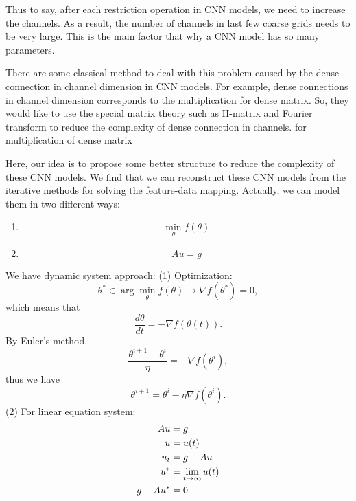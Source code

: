 Thus to say, after each restriction operation in CNN models, we need to increase the channels.
As a result, the number of channels in last few coarse grids needs to be very large. This is the main factor
that why a CNN model has so many parameters.

There are some classical method to deal with this problem caused by the dense connection in channel dimension in CNN models. For example, dense connections in channel dimension corresponds to the 
multiplication for dense matrix. So, they would like to use the special matrix theory such as H-matrix and Fourier transform to reduce the complexity of dense connection in channels.
for multiplication of dense matrix 


Here, our idea is to propose some better structure to 
reduce the complexity of these CNN models. 
We find that we can reconstruct these CNN models from the 
iterative methods for solving the feature-data mapping.
Actually, we can model them in two different ways:
\begin{enumerate}
	\item \begin{equation}
	\min_{\theta} f(\theta) 
	\end{equation}
	\item \begin{equation}Au=g \end{equation}
\end{enumerate}

We have dynamic system approach:
(1) Optimization: 
\begin{equation}
\theta^*\in \arg\min_{\theta} f(\theta)\to \nabla f(\theta^*)=0 ,
\end{equation}
which means that
\begin{equation}
\frac{d\theta}{dt}=-\nabla f(\theta(t)) .
\end{equation}
By Euler's method,
\begin{equation}
\frac{\theta^{i+1}-\theta^i}{\eta}=-\nabla f(\theta^i) ,
\end{equation}
thus we have
\begin{equation}
\theta^{i+1}=\theta^i-\eta\nabla f(\theta^i) .
\end{equation}
(2) For linear equation system:
\begin{align}
Au&=g  \\\notag
u&=u(t) \\\notag
u_t&=g-Au\\\notag
u^*&=\lim_{t\to \infty}u(t)\\\notag
g-Au^*&=0
\end{align}

